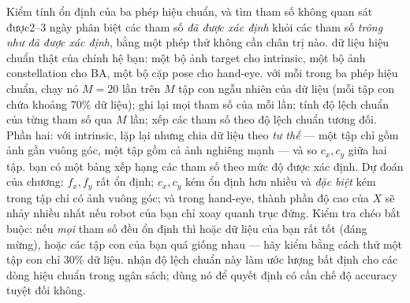 \documentclass[../../marker.tex]{subfiles}
\begin{document}
\begin{duan}{Kiểm tính ổn định của ba phép hiệu chuẩn, và tìm tham số không quan sát được}{2--3 ngày}
\dmt phân biệt các tham số \emph{đã được xác định} khỏi các tham số \emph{trông như đã được xác định}, bằng một phép thử không cần chân trị nào.
\ddl dữ liệu hiệu chuẩn thật của chính hệ bạn: một bộ ảnh target cho intrinsic, một bộ ảnh constellation cho BA, một bộ cặp pose cho hand-eye.
\dbc với mỗi trong ba phép hiệu chuẩn, chạy nó \(M = 20\) lần trên \(M\) tập con ngẫu nhiên của dữ liệu (mỗi tập con chứa khoảng 70\% dữ liệu); ghi lại mọi tham số của mỗi lần; tính độ lệch chuẩn của từng tham số qua \(M\) lần; xếp các tham số theo độ lệch chuẩn tương đối. Phần hai: với intrinsic, lặp lại nhưng chia dữ liệu theo \emph{tư thế} --- một tập chỉ gồm ảnh gần vuông góc, một tập gồm cả ảnh nghiêng mạnh --- và so \(c_x, c_y\) giữa hai tập.
\dxk bạn có một bảng xếp hạng các tham số theo mức độ được xác định. Dự đoán của chương: \(f_x, f_y\) rất ổn định; \(c_x, c_y\) kém ổn định hơn nhiều và \emph{đặc biệt} kém trong tập chỉ có ảnh vuông góc; và trong hand-eye, thành phần độ cao của \(X\) sẽ nhảy nhiều nhất nếu robot của bạn chỉ xoay quanh trục đứng. Kiểm tra chéo bắt buộc: nếu \emph{mọi} tham số đều ổn định thì hoặc dữ liệu của bạn rất tốt (đáng mừng), hoặc các tập con của bạn quá giống nhau --- hãy kiểm bằng cách thử một tập con chỉ 30\% dữ liệu.
\dnv {} nhận độ lệch chuẩn này làm ước lượng bất định cho các dòng hiệu chuẩn trong ngân sách;  dùng nó để quyết định có cần chế độ accuracy tuyệt đối không.
\end{duan}
\end{document}
